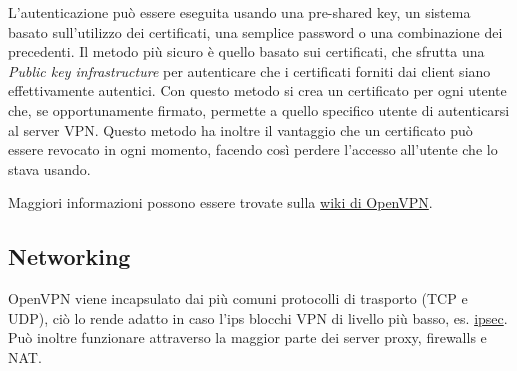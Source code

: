 L'autenticazione può essere eseguita usando una pre-shared key, un sistema basato sull'utilizzo dei certificati, una semplice password o una combinazione dei precedenti. Il metodo più sicuro è quello basato sui certificati, che sfrutta una \textit{Public key infrastructure} \cite{pki} per autenticare che i certificati forniti dai client siano effettivamente autentici. Con questo metodo si crea un certificato per ogni utente che, se opportunamente firmato, permette a quello specifico utente di autenticarsi al server VPN. Questo metodo ha inoltre il vantaggio che un certificato può essere revocato in ogni momento, facendo così perdere l'accesso all'utente che lo stava usando. 

Maggiori informazioni possono essere trovate sulla \href{https://community.openvpn.net/openvpn/wiki/How_does_PKI_work}{wiki di OpenVPN}.

\subsection{Networking}

OpenVPN viene incapsulato dai più comuni protocolli di trasporto (TCP e UDP), ciò lo rende adatto in caso l'ips blocchi VPN di livello più basso, es. \href{https://en.wikipedia.org/wiki/IPsec}{ipsec}. Può inoltre funzionare attraverso la maggior parte dei server proxy, firewalls e NAT.

